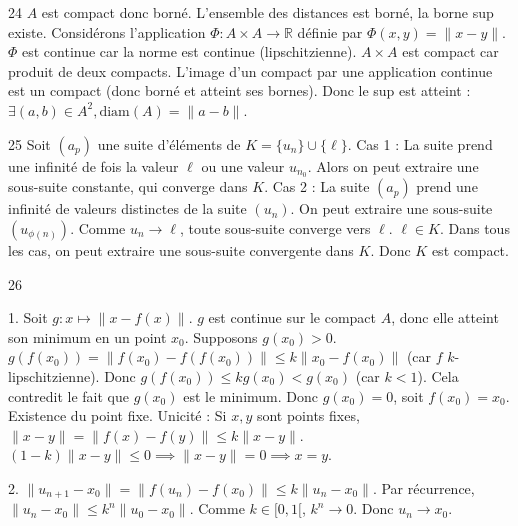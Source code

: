 \begin{correction}{24}
$A$ est compact donc borné. L'ensemble des distances est borné, la borne sup existe.
Considérons l'application $\Phi : A \times A \rightarrow \mathbb{R}$ définie par $\Phi(x,y) = \|x-y\|$.
$\Phi$ est continue car la norme est continue (lipschitzienne).
$A \times A$ est compact car produit de deux compacts.
L'image d'un compact par une application continue est un compact (donc borné et atteint ses bornes).
Donc le sup est atteint : $\exists (a,b) \in A^{2}, \text{diam}(A) = \|a-b\|$.
\end{correction}

\begin{correction}{25}
Soit $(a_{p})$ une suite d'éléments de $K = \{u_{n}\} \cup \{\ell\}$.
Cas 1 : La suite prend une infinité de fois la valeur $\ell$ ou une valeur $u_{n_0}$. Alors on peut extraire une sous-suite constante, qui converge dans $K$.
Cas 2 : La suite $(a_{p})$ prend une infinité de valeurs distinctes de la suite $(u_{n})$.
On peut extraire une sous-suite $(u_{\phi(n)})$.
Comme $u_{n} \to \ell$, toute sous-suite converge vers $\ell$.
$\ell \in K$.
Dans tous les cas, on peut extraire une sous-suite convergente dans $K$.
Donc $K$ est compact.
\end{correction}

\begin{correction}{26}

1. Soit $g : x \mapsto \|x-f(x)\|$. $g$ est continue sur le compact $A$, donc elle atteint son minimum en un point $x_{0}$.
Supposons $g(x_{0}) > 0$.
$g(f(x_{0})) = \|f(x_{0}) - f(f(x_{0}))\| \le k \|x_{0} - f(x_{0})\|$ (car $f$ $k$-lipschitzienne).
Donc $g(f(x_{0})) \le k g(x_{0}) < g(x_{0})$ (car $k < 1$).
Cela contredit le fait que $g(x_{0})$ est le minimum.
Donc $g(x_{0}) = 0$, soit $f(x_{0}) = x_{0}$. Existence du point fixe.
Unicité : Si $x, y$ sont points fixes, $\|x-y\| = \|f(x)-f(y)\| \le k \|x-y\|$.
$(1-k)\|x-y\| \le 0 \implies \|x-y\| = 0 \implies x=y$.

2. $\|u_{n+1} - x_{0}\| = \|f(u_{n}) - f(x_{0})\| \le k \|u_{n} - x_{0}\|$.
Par récurrence, $\|u_{n} - x_{0}\| \le k^{n} \|u_{0} - x_{0}\|$.
Comme $k \in [0,1[$, $k^{n} \to 0$. Donc $u_{n} \to x_{0}$.
\end{correction}

